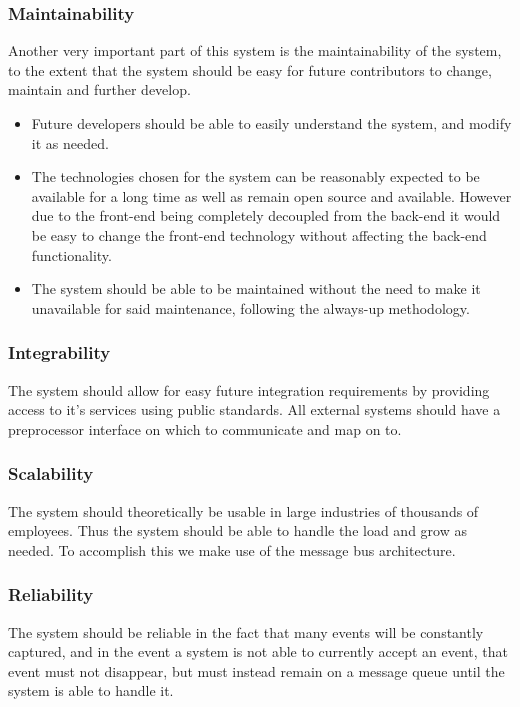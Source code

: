 \documentclass[11pt,a4paper]{article}
\begin{document}
\subsubsection{Maintainability}
Another very important part of this system is the maintainability of the system, to the extent that the system should be easy for future contributors to change, maintain and further develop.
\begin{itemize}
	\item Future developers should be able to easily understand the system, and modify it as needed.
	\item The technologies chosen for the system can be reasonably expected to be available for a long time as well as remain open source and available. However due to the front-end being completely decoupled from the back-end it would be easy to change the front-end technology without affecting the back-end functionality.
	\item The system should be able to be maintained without the need to make it unavailable for said maintenance, following the always-up methodology.
\end{itemize}

\subsubsection{Integrability}
The system should allow for easy future integration requirements by providing access to it's services using public standards. All external systems should have a preprocessor interface on which to communicate and map on to.

\subsubsection{Scalability}
The system should theoretically be usable in large industries of thousands of employees. Thus the system should be able to handle the load and grow as needed. To accomplish this we make use of the message bus architecture.

\subsubsection{Reliability}
The system should be reliable in the fact that many events will be constantly captured, and in the event a system is not able to currently accept an event, that event must not disappear, but must instead remain on a message queue until the system is able to handle it.
\end{document}
